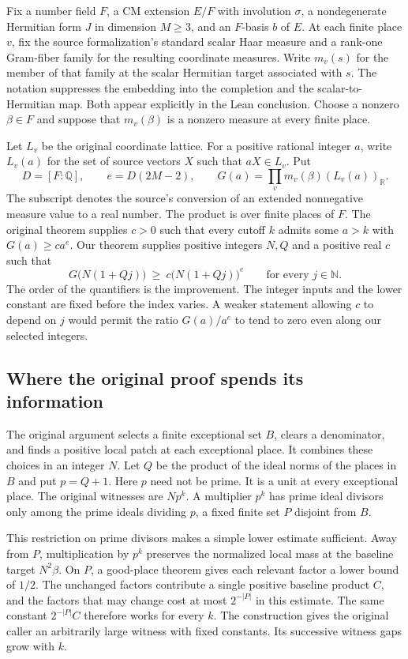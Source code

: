 \documentclass[12pt,letterpaper]{article}
\begin{document}
Fix a number field $F$, a CM extension $E/F$ with involution $\sigma$, a nondegenerate Hermitian form $J$ in dimension $M\geq 3$, and an $F$-basis $b$ of $E$. At each finite place $v$, fix the source formalization's standard scalar Haar measure and a rank-one Gram-fiber family for the resulting coordinate measures. Write $m_v(s)$ for the member of that family at the scalar Hermitian target associated with $s$. The notation suppresses the embedding into the completion and the scalar-to-Hermitian map. Both appear explicitly in the Lean conclusion. Choose a nonzero $\beta\in F$ and suppose that $m_v(\beta)$ is a nonzero measure at every finite place.

Let $L_v$ be the original coordinate lattice. For a positive rational integer $a$, write $L_v(a)$ for the set of source vectors $X$ such that $aX\in L_v$. Put
\[
 D=[F:\mathbb Q],\qquad e=D(2M-2),\qquad
 G(a)=\prod_v m_v(\beta)(L_v(a))_{\mathbb R}.
\]
The subscript denotes the source's conversion of an extended nonnegative measure value to a real number. The product is over finite places of $F$. The original theorem supplies $c>0$ such that every cutoff $k$ admits some $a>k$ with $G(a)\geq ca^e$. Our theorem supplies positive integers $N,Q$ and a positive real $c$ such that
\[
       G\bigl(N(1+Qj)\bigr)\ \geq\ c\bigl(N(1+Qj)\bigr)^e
       \qquad \text{for every }j\in\mathbb N .
\]
The order of the quantifiers is the improvement. The integer inputs and the lower constant are fixed before the index varies. A weaker statement allowing $c$ to depend on $j$ would permit the ratio $G(a)/a^e$ to tend to zero even along our selected integers.

\subsection{Where the original proof spends its information}

The original argument selects a finite exceptional set $B$, clears a denominator, and finds a positive local patch at each exceptional place. It combines these choices in an integer $N$. Let $Q$ be the product of the ideal norms of the places in $B$ and put $p=Q+1$. Here $p$ need not be prime. It is a unit at every exceptional place. The original witnesses are $Np^k$. A multiplier $p^k$ has prime ideal divisors only among the prime ideals dividing $p$, a fixed finite set $P$ disjoint from $B$.

This restriction on prime divisors makes a simple lower estimate sufficient. Away from $P$, multiplication by $p^k$ preserves the normalized local mass at the baseline target $N^2\beta$. On $P$, a good-place theorem gives each relevant factor a lower bound of $1/2$. The unchanged factors contribute a single positive baseline product $C$, and the factors that may change cost at most $2^{-|P|}$ in this estimate. The same constant $2^{-|P|}C$ therefore works for every $k$. The construction gives the original caller an arbitrarily large witness with fixed constants. Its successive witness gaps grow with $k$.
\end{document}
